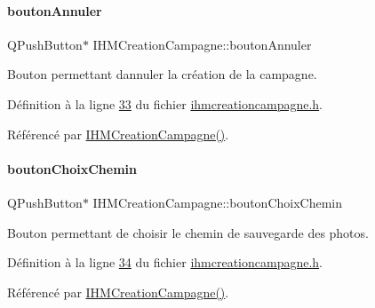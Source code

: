 \paragraph{\texorpdfstring{bouton\+Annuler}{boutonAnnuler}}
{\footnotesize\ttfamily Q\+Push\+Button$\ast$ I\+H\+M\+Creation\+Campagne\+::bouton\+Annuler\hspace{0.3cm}{\ttfamily [private]}}



Bouton permettant d\textquotesingle{}annuler la création de la campagne. 



Définition à la ligne \hyperlink{ihmcreationcampagne_8h_source_l00033}{33} du fichier \hyperlink{ihmcreationcampagne_8h_source}{ihmcreationcampagne.\+h}.



Référencé par \hyperlink{ihmcreationcampagne_8cpp_source_l00011}{I\+H\+M\+Creation\+Campagne()}.

\mbox{\label{class_i_h_m_creation_campagne_ab709b06a83d8e1ebf9c920e7c60e2d79}} 
\paragraph{\texorpdfstring{bouton\+Choix\+Chemin}{boutonChoixChemin}}
{\footnotesize\ttfamily Q\+Push\+Button$\ast$ I\+H\+M\+Creation\+Campagne\+::bouton\+Choix\+Chemin\hspace{0.3cm}{\ttfamily [private]}}



Bouton permettant de choisir le chemin de sauvegarde des photos. 



Définition à la ligne \hyperlink{ihmcreationcampagne_8h_source_l00034}{34} du fichier \hyperlink{ihmcreationcampagne_8h_source}{ihmcreationcampagne.\+h}.



Référencé par \hyperlink{ihmcreationcampagne_8cpp_source_l00011}{I\+H\+M\+Creation\+Campagne()}.

\mbox{\label{class_i_h_m_creation_campagne_a7c1dbc0141ba19b9ac16ea1444cd5d6f}} 
